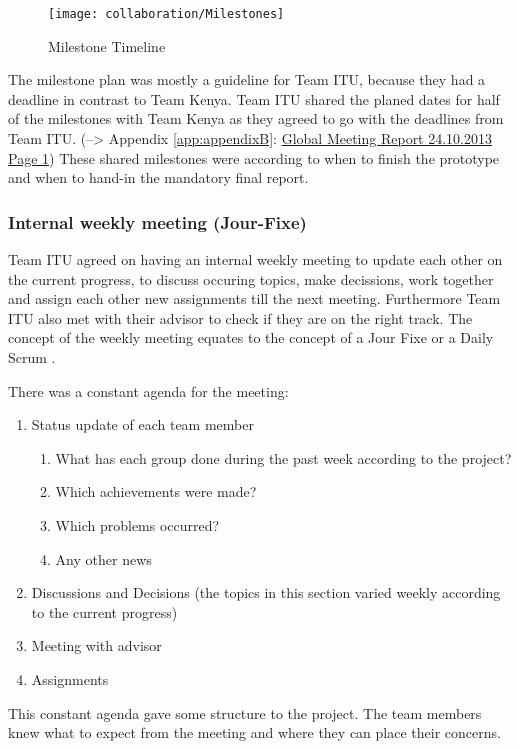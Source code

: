 	\begin{figure}[htb]
		\centering
		\texttt{[image: collaboration/Milestones]}
		\caption{Milestone Timeline}
		\label{fig:milestones}
	\end{figure}

The milestone plan was mostly a guideline for Team ITU, because they had a deadline in contrast to Team Kenya. Team ITU shared the planed dates for half of the milestones with Team Kenya as they agreed to go with the deadlines from Team ITU. (--> Appendix \ref{app:appendixB}: \hyperlink{GSD20131024.1}{Global Meeting Report 24.10.2013 Page 1}) These shared milestones were according to when to finish the prototype and when to hand-in the mandatory final report.

\subsubsection{Internal weekly meeting (Jour-Fixe)}
Team ITU agreed on having an internal weekly meeting to update each other on the current progress, to discuss occuring topics, make decissions, work together and assign each other new assignments till the next meeting. Furthermore Team ITU also met with their advisor to check if they are on the right track. The concept of the weekly meeting equates to the concept of a Jour Fixe  or a Daily Scrum .

There was a constant agenda for the meeting:

	\begin{enumerate}
		\item Status update of each team member
			\begin{enumerate}
				\item What has each group done during the past week according to the project?
				\item Which achievements were made?	
				\item Which problems occurred?
				\item Any other news
			\end{enumerate}
		\item Discussions and Decisions (the topics in this section varied weekly according to the current progress)
		\item Meeting with advisor	
		\item Assignments
	\end{enumerate}

This constant agenda gave some structure to the project. The team members knew what to expect from the meeting and where they can place their concerns.

